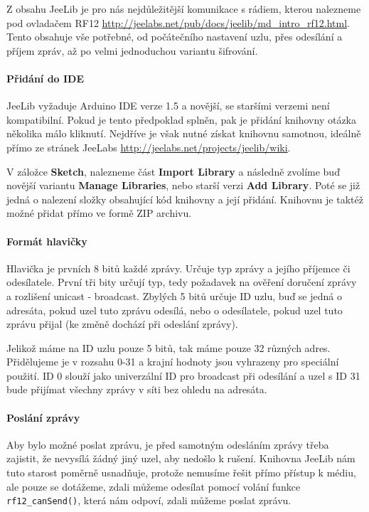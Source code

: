\documentclass[12pt,titlepage]{article}
\begin{document}
		Z obsahu JeeLib je pro nás nejdůležitější komunikace s rádiem, kterou nalezneme pod ovladačem RF12 \url{http://jeelabs.net/pub/docs/jeelib/md_intro_rf12.html}. Tento obsahuje vše potřebné, od počátečního nastavení uzlu, přes odesílání a příjem zpráv, až po velmi jednoduchou variantu šifrování. 
	
		\paragraph{Přidání do IDE}
		JeeLib vyžaduje Arduino IDE verze 1.5 a novější, se staršími verzemi není kompatibilní. Pokud je tento předpoklad splněn, pak je přidání knihovny otázka několika málo kliknutí. Nejdříve je však nutné získat knihovnu samotnou, ideálně přímo ze stránek JeeLabs \url{http://jeelabs.net/projects/jeelib/wiki}. 
		
		V záložce \textbf{Sketch}, nalezneme část \textbf{Import Library} a následně zvolíme buď novější variantu \textbf{Manage Libraries}, nebo starší verzi \textbf{Add Library}. Poté se již jedná o nalezení složky obsahující kód knihovny a její přidání. Knihovnu je taktéž možné přidat přímo ve formě ZIP archivu. 
		
		\paragraph{Formát hlavičky}
		Hlavička je prvních 8 bitů každé zprávy. Určuje typ zprávy a jejího příjemce či odesílatele. První tři bity určují typ, tedy požadavek na ověření doručení zprávy a rozlišení unicast - broadcast. Zbylých 5 bitů určuje ID uzlu, buď se jedná o adresáta, pokud uzel tuto zprávu odesílá, nebo o odesílatele, pokud uzel tuto zprávu přijal (ke změně dochází při odeslání zprávy). 
		
		Jelikož máme na ID uzlu pouze 5 bitů, tak máme pouze 32 různých adres. Přidělujeme je v rozsahu 0-31 a krajní hodnoty jsou vyhrazeny pro speciální použití. ID 0 slouží jako univerzální ID pro broadcast při odesílání a uzel s ID 31 bude přijímat všechny zprávy v síti bez ohledu na adresáta.
		
		\paragraph{Poslání zprávy}
		Aby bylo možné poslat zprávu, je před samotným odesláním zprávy třeba zajistit, že nevysílá žádný jiný uzel, aby nedošlo k rušení. Knihovna JeeLib nám tuto starost poměrně usnadňuje, protože nemusíme řešit přímo přístup k médiu, ale pouze se dotážeme, zdali můžeme odesílat pomocí volání funkce \texttt{rf12\_canSend()}, která nám odpoví, zdali můžeme poslat zprávu. 
		
\end{document}
